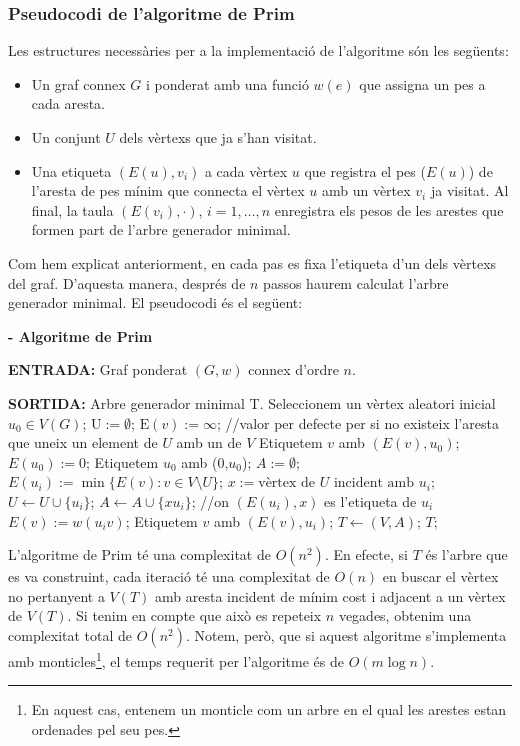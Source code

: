 \documentclass{article}
\renewcommand{\algorithmicrequire}{\textbf{ENTRADA: }}
\renewcommand{\algorithmicensure}{\textbf{SORTIDA: }}
\begin{document}
\subsubsection{Pseudocodi de l'algoritme de Prim}
Les estructures necessàries per a la implementació de l'algoritme són les següents:
\begin{itemize}
    \item Un graf connex $G$ i ponderat amb una funció $w(e)$ que assigna un pes a cada aresta.
    \item Un conjunt $U$ dels vèrtexs que ja s'han visitat.
    \item Una etiqueta $(E(u),v_i)$ a cada vèrtex $u$ que registra el pes ($E(u)$) de l'aresta de pes mínim que connecta el vèrtex $u$ amb un vèrtex $v_i$ ja visitat. Al final, la taula $(E(v_i),\cdot)$, $i=1,\ldots,n$ enregistra els pesos de les arestes que formen part de l'arbre generador minimal.
\end{itemize}
Com hem explicat anteriorment, en cada pas es fixa l'etiqueta d'un dels vèrtexs del graf. D'aquesta manera, després de $n$ passos haurem calculat l'arbre generador minimal. El pseudocodi és el següent: 
\begin{algorithm}[H]
\caption{\textbf{- Algoritme de Prim}}
\begin{algorithmic}
\item \algorithmicrequire{Graf ponderat $(G,w)$ connex d’ordre $n$.}
\item \algorithmicensure{Arbre generador minimal T.}
\State 
\State Seleccionem un vèrtex aleatori inicial $u_0\in V(G)$;
\State $\text{U}:=\emptyset$;
\State $\text{E}(v):=\infty$;  //valor per defecte per si no existeix l'aresta que uneix un element de $U$ amb un de $V$
\State Etiquetem $v$ amb $(E(v),u_0)$;
\EndFor
\State $E(u_0):=0$;
\State Etiquetem ${u_0}$ amb (0,${u_0}$);
\State $A:=\emptyset$;
\State $E(u_i):=\min\{E(v): v\in V\setminus U\}$;
\State $x:=\text{vèrtex de $U$ incident amb $u_i$}$;
\State$U\gets U\cup \{u_i\}$;
\State$A\gets A\cup \{xu_i\}$; //on $(E(u_i),x)$ es l'etiqueta de $u_i$
\State $E(v):=w(u_iv)$;
\State Etiquetem $v$ amb $(E(v),u_i)$;
\EndIf
\EndFor
\EndFor
\State $T \gets (V,A)$;
\State\Return $T$;
\end{algorithmic}
\end{algorithm}
\par\cite{7}\par 
L’algoritme de Prim té una complexitat de $O(n^2)$. En efecte, si $T$ és l'arbre que es va construint, cada iteració té una complexitat de $O(n)$ en buscar el vèrtex no pertanyent a $V(T)$ amb aresta incident de mínim cost i adjacent a un vèrtex de $V(T)$. Si tenim en compte que això es repeteix $n$ vegades, obtenim una complexitat total de $O(n^2)$. Notem, però, que si aquest algoritme s’implementa amb monticles\footnote{En aquest cas, entenem un monticle com un arbre en el qual les arestes estan ordenades pel seu pes.}, el temps requerit per l’algoritme és de $O(m\log n)$. \cite{6}
\end{document}
